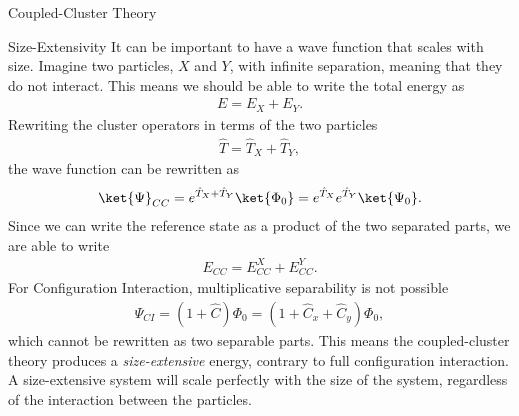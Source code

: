 \documentclass[twoside,english]{uiofysmaster}
\begin{document}
\begin{chapter}{Coupled-Cluster Theory}
  	\begin{section}{Size-Extensivity}
  		It can be important to have a wave function that scales with size. Imagine two particles, $X$ and $Y$, with infinite separation, meaning that they do not interact. This means we should be able to write the total energy as
  		\begin{align}
  			E = E_X + E_Y.
  		\end{align}
  		Rewriting the cluster operators in terms of the two particles
  		\begin{align}
  			\hat T = \hat T_X + \hat T_Y,
  		\end{align}
  		the wave function can be rewritten as 
  		\begin{align}
  			\ket{\Psi}_{CC} = e^{\hat T_X + \hat T_Y} \ket{\Phi_0} = e^{\hat T_X} e^{\hat T_Y} \ket{\Psi_0}.
  		\end{align}
  		Since we can write the reference state as a product of the two separated parts, we are able to write
  		\begin{align}
  			E_{CC} = E_{CC}^X + E_{CC}^Y.
  		\end{align}
  		For Configuration Interaction, multiplicative separability is not possible
  		\begin{align}
  			\Psi_{CI} = \left(1 + \hat C\right) \Phi_0 = \left( 1 + \hat C_x + \hat C_y \right) \Phi_0,
  		\end{align}
  		which cannot be rewritten as two separable parts. This means the coupled-cluster theory produces a \textit{size-extensive} energy, contrary to full configuration interaction. A size-extensive system will scale perfectly with the size of the system, regardless of the interaction between the particles.

  	\end{section}


\end{chapter}
\end{document}
